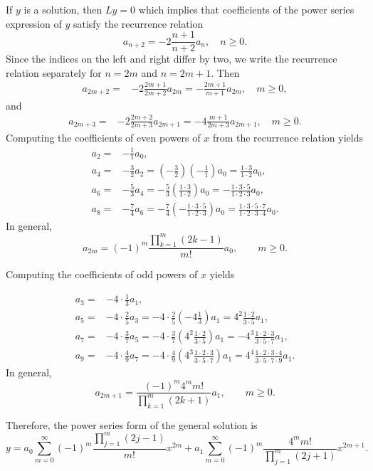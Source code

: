 \begin{solution}
If $y$ is a solution, then $Ly=0$ which implies that coefficients of the power series expression of $y$ satisfy the recurrence relation
\[a_{n+2}=-2\frac{n+1}{n+2}a_n,\quad n\ge0.\]
Since the indices on the left and right differ by two, we write the recurrence relation separately for $n=2m$ and $n=2m+1$. 
Then
\[
  \begin{aligned} 
  a_{2m+2} 
  =& -2 \frac{2m+1}{2m+2}a_{2m} =-\frac{2m+1}{ m+1}a_{2m},\quad m \ge0,
  \end{aligned}
\]
and
\[
  \begin{aligned} 
    a_{2m+3} =& -2\frac{2m+2}{2m+3}a_{2m+1} =-4\frac{m+1}{2m+3}a_{2m+1},\quad m\ge0.
  \end{aligned}
\]
Computing the coefficients of even powers of $x$ from the recurrence relation yields
\[
  \begin{aligned} 
    a_2 
    =& -\frac{1}{1}a_0,\\
    a_4 =& -\frac{3}{2}a_2=\left(-\frac{3}{2}\right)\left(-\frac{1}{1}\right)a_0 =\frac{1\cdot3}{1\cdot2}a_0, \\
    a_6 =& -\frac{5}{3}a_4= -\frac{5}{3}\left(\frac{1\cdot3}{1\cdot2}\right)a_0 =-\frac{1\cdot3\cdot5}{1\cdot2\cdot3}a_0, \\
    a_8 =& -\frac{7}{4}a_6=-\frac{7}{4} \left(-\frac{1\cdot3\cdot5}{1\cdot2\cdot3}\right)a_0= \frac{1\cdot3\cdot5\cdot7}{1\cdot2\cdot3\cdot4}a_0.
  \end{aligned}
\] 
In general,
\[a_{2m}=(-1)^m\frac{\prod_{k=1}^m(2k-1)}{m!}a_0,\qquad m\ge0.\]

Computing the coefficients of odd powers of $x$ yields

\[
  \begin{aligned} 
    a_3 =& -4\cdot\frac{1}{3}a_1, \\ 
    a_5 =& -4\cdot\frac{2}{5}a_3=-4\cdot\frac{2}{5}\left(-4\frac{1}{3}\right)a_1 =4^2\frac{1\cdot2}{3\cdot5}a_1, \\ 
    a_7 =& -4\cdot\frac{3}{7}a_5=-4\cdot\frac{3}{7}\left( 4^2\frac{1\cdot2}{3\cdot5}\right)a_1= -4^3\frac{1\cdot2\cdot3}{3\cdot5\cdot7}a_1,\\ 
    a_9 =& -4\cdot \frac{4}{9}a_7=-4\cdot \frac{4}{9}\left( 4^3\frac{1\cdot2\cdot3}{3\cdot5\cdot7}\right)a_1= 4^4\frac{1\cdot2\cdot3\cdot4}{3\cdot5\cdot7\cdot9}a_1.
  \end{aligned}
\]
In general,
\[a_{2m+1}=\dfrac{(-1)^m4^m m!}{\prod_{k=1}^m(2k+1)}a_1,\qquad m\ge0.\]

Therefore, the power series form of the general solution is
\[
  y=a_0 \sum^\infty_{m=0}(-1)^m \frac{\prod_{j=1}^m(2j-1)}{m!}x^{2m} +a_1 \sum^\infty_{m=0}(-1)^m \frac{4^mm!}{\prod_{j=1}^m(2j+1)} x^{2m+1}.
\]
\end{solution}


